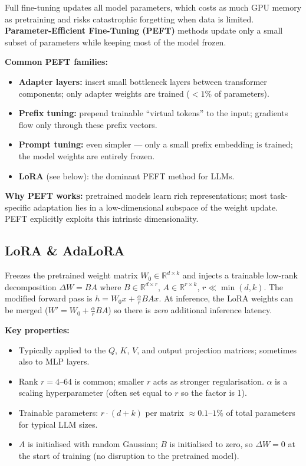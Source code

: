 Full fine-tuning updates all model parameters, which costs as much GPU memory as
pretraining and risks catastrophic forgetting when data is limited.
\textbf{Parameter-Efficient Fine-Tuning (PEFT)} methods update only a small subset of
parameters while keeping most of the model frozen.

\textbf{Common PEFT families:}
\begin{itemize}
  \item \textbf{Adapter layers:} insert small bottleneck layers between transformer
    components; only adapter weights are trained ($<1\%$ of parameters).
  \item \textbf{Prefix tuning:} prepend trainable ``virtual tokens'' to the input;
    gradients flow only through these prefix vectors.
  \item \textbf{Prompt tuning:} even simpler --- only a small prefix embedding is
    trained; the model weights are entirely frozen.
  \item \textbf{LoRA} (see below): the dominant PEFT method for LLMs.
\end{itemize}

\textbf{Why PEFT works:} pretrained models learn rich representations; most task-
specific adaptation lies in a low-dimensional subspace of the weight update. PEFT
explicitly exploits this intrinsic dimensionality.

\subsection{LoRA \& AdaLoRA}

\begin{paperbox}[title={LoRA: Low-Rank Adaptation (Hu et al.\ 2022)}]
  Freezes the pretrained weight matrix $W_0 \in \mathbb{R}^{d \times k}$ and
  injects a trainable low-rank decomposition $\Delta W = BA$ where
  $B \in \mathbb{R}^{d \times r}$, $A \in \mathbb{R}^{r \times k}$, $r \ll \min(d,k)$.
  The modified forward pass is $h = W_0 x + \frac{\alpha}{r} B A x$.
  At inference, the LoRA weights can be merged ($W' = W_0 + \frac{\alpha}{r}BA$)
  so there is \emph{zero} additional inference latency.
\end{paperbox}

\textbf{Key properties:}
\begin{itemize}
  \item Typically applied to the $Q$, $K$, $V$, and output projection matrices;
    sometimes also to MLP layers.
  \item Rank $r = 4$--$64$ is common; smaller $r$ acts as stronger regularisation.
    $\alpha$ is a scaling hyperparameter (often set equal to $r$ so the factor is 1).
  \item Trainable parameters: $r \cdot (d + k)$ per matrix $\approx 0.1$--$1\%$ of
    total parameters for typical LLM sizes.
  \item $A$ is initialised with random Gaussian; $B$ is initialised to zero, so
    $\Delta W = 0$ at the start of training (no disruption to the pretrained model).
\end{itemize}

